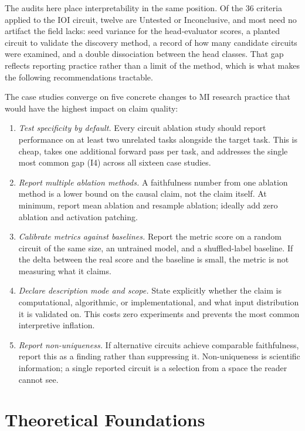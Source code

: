 \documentclass{article}
\begin{document}
The audits here place interpretability in the same position. Of the 36 criteria applied to the IOI circuit, twelve are Untested or Inconclusive, and most need no artifact the field lacks: seed variance for the head-evaluator scores, a planted circuit to validate the discovery method, a record of how many candidate circuits were examined, and a double dissociation between the head classes. That gap reflects reporting practice rather than a limit of the method, which is what makes the following recommendations tractable.

The case studies converge on five concrete changes to MI research practice that would have the highest impact on claim quality:
\begin{enumerate}[nosep]
\item \emph{Test specificity by default.} Every circuit ablation study should report performance on at least two unrelated tasks alongside the target task. This is cheap, takes one additional forward pass per task, and addresses the single most common gap (I4) across all sixteen case studies.
\item \emph{Report multiple ablation methods.} A faithfulness number from one ablation method is a lower bound on the causal claim, not the claim itself. At minimum, report mean ablation and resample ablation; ideally add zero ablation and activation patching.
\item \emph{Calibrate metrics against baselines.} Report the metric score on a random circuit of the same size, an untrained model, and a shuffled-label baseline. If the delta between the real score and the baseline is small, the metric is not measuring what it claims.
\item \emph{Declare description mode and scope.} State explicitly whether the claim is computational, algorithmic, or implementational, and what input distribution it is validated on. This costs zero experiments and prevents the most common interpretive inflation.
\item \emph{Report non-uniqueness.} If alternative circuits achieve comparable faithfulness, report this as a finding rather than suppressing it. Non-uniqueness is scientific information; a single reported circuit is a selection from a space the reader cannot see.
\end{enumerate}




\section{Theoretical Foundations}
\label{sec:foundations}
\end{document}
